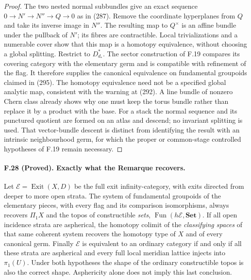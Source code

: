 \begin{proof}
The two nested normal subbundles give an exact sequence
$0\to N'\to N''\to Q\to0$ as in (287). Remove the coordinate
hyperplanes from $Q$ and take its inverse image in $N''$.
The resulting map to $Q^\times$ is an affine bundle under the
pullback of $N'$; its fibres are contractible. Local trivializations
and a numerable cover show that this map is a homotopy equivalence,
without choosing a global splitting. Restrict to $D_{d_*}^*$.
The sector construction of F.19 compares its covering category with
the elementary germ and is compatible with refinement of the flag.
It therefore supplies the canonical equivalence on fundamental
groupoids claimed in (295). The homotopy equivalence need not be
a specified global analytic map, consistent with the warning at
(292). A line bundle of nonzero Chern class already shows why one
must keep the torus bundle rather than replace it by a product with
the base. For a stack the normal sequence and its punctured quotient
are formed on an atlas and descend; no invariant splitting is used.
That vector-bundle descent is distinct from identifying the result
with an intrinsic neighbourhood germ, for which the proper or
common-stage controlled hypotheses of F.19 remain necessary.
\end{proof}

\paragraph{F.28 (Proved). Exactly what the Remarque recovers.}
Let $\mathcal E=\operatorname{Exit}(X,D)$ be the full exit
infinity-category, with exits directed from deeper to more open
strata. The system of fundamental groupoids of the elementary
pieces, with every flag and its comparison isomorphisms, always
recovers $\Pi_1X$ and the topos of constructible \emph{sets},
$\operatorname{Fun}(h\mathcal E,\mathbf{Set})$.
If all open incidence strata are aspherical, the homotopy colimit
of the \emph{classifying spaces} of that same coherent system
recovers the homotopy type of $X$ and of every canonical germ.
Finally $\mathcal E$ is equivalent to an ordinary category if and
only if all these strata are aspherical and every full local
meridian lattice injects into $\pi_1(U)$. Under both hypotheses the
shape of the ordinary constructible topos is also the correct shape.
Asphericity alone does not imply this last conclusion.

